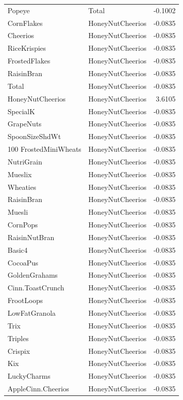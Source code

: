 \begin{longtable}{llr}
Popeye & Total & -0.1002 \\
CornFlakes & HoneyNutCheerios & -0.0835 \\
Cheerios & HoneyNutCheerios & -0.0835 \\
RiceKrispies & HoneyNutCheerios & -0.0835 \\
FrostedFlakes & HoneyNutCheerios & -0.0835 \\
RaisinBran & HoneyNutCheerios & -0.0835 \\
Total & HoneyNutCheerios & -0.0835 \\
HoneyNutCheerios & HoneyNutCheerios & 3.6105 \\
SpecialK & HoneyNutCheerios & -0.0835 \\
GrapeNuts & HoneyNutCheerios & -0.0835 \\
SpoonSizeShdWt & HoneyNutCheerios & -0.0835 \\
100%
FrostedMiniWheats & HoneyNutCheerios & -0.0835 \\
NutriGrain & HoneyNutCheerios & -0.0835 \\
Mueslix & HoneyNutCheerios & -0.0835 \\
Wheaties & HoneyNutCheerios & -0.0835 \\
RaisinBran & HoneyNutCheerios & -0.0835 \\
Muesli & HoneyNutCheerios & -0.0835 \\
CornPops & HoneyNutCheerios & -0.0835 \\
RaisinNutBran & HoneyNutCheerios & -0.0835 \\
Basic4 & HoneyNutCheerios & -0.0835 \\
CocoaPus & HoneyNutCheerios & -0.0835 \\
GoldenGrahams & HoneyNutCheerios & -0.0835 \\
Cinn.ToastCrunch & HoneyNutCheerios & -0.0835 \\
FrootLoops & HoneyNutCheerios & -0.0835 \\
LowFatGranola & HoneyNutCheerios & -0.0835 \\
Trix & HoneyNutCheerios & -0.0835 \\
Triples & HoneyNutCheerios & -0.0835 \\
Crispix & HoneyNutCheerios & -0.0835 \\
Kix & HoneyNutCheerios & -0.0835 \\
LuckyCharms & HoneyNutCheerios & -0.0835 \\
AppleCinn.Cheerios & HoneyNutCheerios & -0.0835 \\

\end{longtable}

